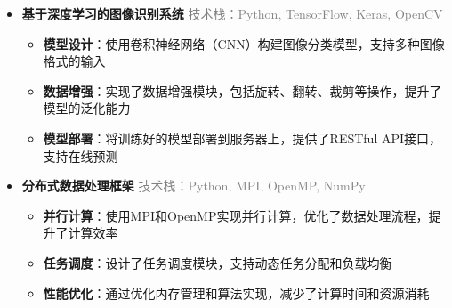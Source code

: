 \documentclass[zh]{resume}
\begin{document}
\vspace{-1.5em} 

\newcommand{\projectitem}[3]{%
  \vspace{0.2em} 
  \noindent 
  \begin{minipage}[t]{\linewidth} 
    {\large\bfseries\textcolor{accentcolor}{#1}} \hfill {\small\textcolor{gray}{#2}}\par 
    \vspace{0.3em} 
    #3 
  \end{minipage} 
  \vspace{0.8em} 
} 

\begin{itemize}[leftmargin=1.5em, nosep, before=\vspace{-0.5em}, after=\vspace{-0.5em}] 
  \item[] 
  \projectitem{基于深度学习的图像识别系统} 
    {技术栈：Python, TensorFlow, Keras, OpenCV} 
    {\begin{itemize}[label=\faAngleRight, leftmargin=2.2em, nosep, topsep=0pt] 
       \item \textbf{模型设计}：使用卷积神经网络（CNN）构建图像分类模型，支持多种图像格式的输入 
       \item \textbf{数据增强}：实现了数据增强模块，包括旋转、翻转、裁剪等操作，提升了模型的泛化能力 
       \item \textbf{模型部署}：将训练好的模型部署到服务器上，提供了RESTful API接口，支持在线预测 
     \end{itemize}} 
     
  \vspace{-0.8em} 
  \item[] 
  \projectitem{分布式数据处理框架} 
    {技术栈：Python, MPI, OpenMP, NumPy} 
    {\begin{itemize}[label=\faAngleRight, leftmargin=2.2em, nosep, topsep=0pt] 
        \item \textbf{并行计算}：使用MPI和OpenMP实现并行计算，优化了数据处理流程，提升了计算效率 
        \item \textbf{任务调度}：设计了任务调度模块，支持动态任务分配和负载均衡 
        \item \textbf{性能优化}：通过优化内存管理和算法实现，减少了计算时间和资源消耗 
     \end{itemize}} 
    

\end{itemize}
\end{document}
